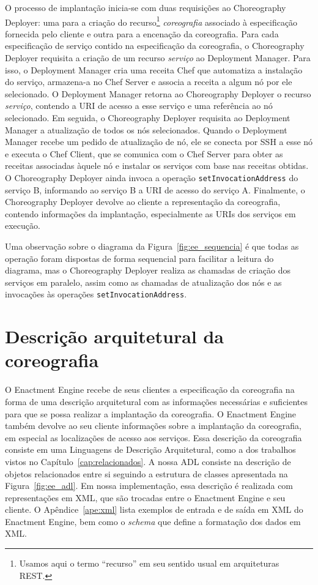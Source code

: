 
O processo de implantação inicia-se com duas requisições ao Choreography Deployer: uma para a criação do recurso\footnote{Usamos aqui o termo ``recurso'' em seu sentido usual em arquiteturas REST.} \emph{coreografia} associado à especificação fornecida pelo cliente e outra para a encenação da coreografia. Para cada especificação de serviço contido na especificação da coreografia, o Choreography Deployer requisita a criação de um recurso \emph{serviço} ao Deployment Manager. Para isso, o Deployment Manager cria uma receita Chef que automatiza a instalação do serviço, armazena-a no Chef Server e associa a receita a algum nó por ele selecionado. O Deployment Manager retorna ao Choreography Deployer o recurso \emph{serviço}, contendo a URI de acesso a esse serviço e uma referência ao nó selecionado. Em seguida, o Choreography Deployer requisita ao Deployment Manager a atualização de todos os nós selecionados. Quando o Deployment Manager recebe um pedido de atualização de nó, ele se conecta por SSH a esse nó e executa o Chef Client, que se comunica com o Chef Server para obter as receitas associadas àquele nó e instalar os serviços com base nas receitas obtidas. O Choreography Deployer ainda invoca a operação \texttt{setInvocationAddress} do serviço B, informando ao serviço B a URI de acesso do serviço A. Finalmente, o Choreography Deployer devolve ao cliente a representação da coreografia, contendo informações da implantação, especialmente as URIs dos serviços em execução.

Uma observação sobre o diagrama da Figura~\ref{fig:ee_sequencia} é que todas as operação foram dispostas de forma sequencial para facilitar a leitura do diagrama, mas o Choreography Deployer realiza as chamadas de criação dos serviços em paralelo, assim como as chamadas de atualização dos nós e as invocações às operações \texttt{setInvocationAddress}.

\section{Descrição arquitetural da coreografia}
\label{sec:adl}

O Enactment Engine recebe de seus clientes a especificação da coreografia na forma de uma descrição arquitetural com as informações necessárias e suficientes para que se possa realizar a implantação da coreografia. O Enactment Engine também devolve ao seu cliente informações sobre a implantação da coreografia, em especial as localizações de acesso aos serviços. Essa descrição da coreografia consiste em uma Linguagens de Descrição Arquitetural, como a dos trabalhos vistos no Capítulo~\ref{cap:relacionados}. A nossa ADL consiste na descrição de objetos relacionados entre si seguindo a estrutura de classes apresentada na Figura~\ref{fig:ee_adl}. Em nossa implementação, essa descrição é realizada com representações em XML, que são trocadas entre o Enactment Engine e seu cliente. O Apêndice~\ref{ape:xml} lista exemplos de entrada e de saída em XML do Enactment Engine, bem como o \emph{schema} que define a formatação dos dados em XML.  

